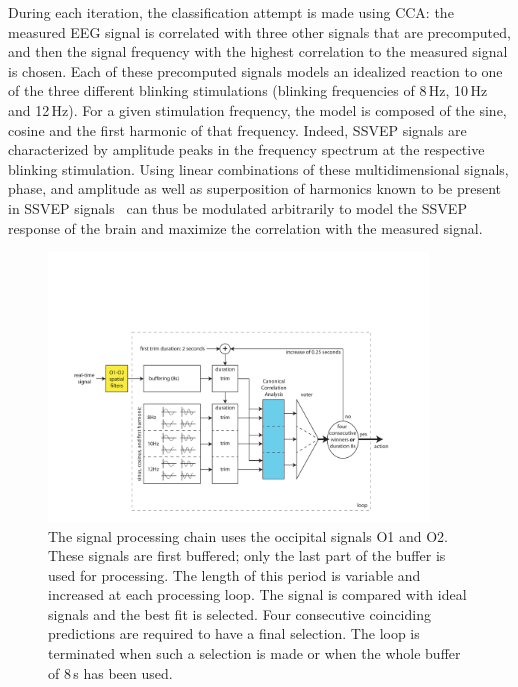 \documentclass[smallextended]{svjour3}
\begin{document}
During each iteration, the classification attempt is made using CCA: the measured EEG signal is correlated with three other signals that are precomputed, and then the signal frequency with the highest correlation to the measured signal is chosen.
Each of these precomputed signals models an idealized reaction to one of the three different blinking stimulations (blinking frequencies of 8\,Hz, 10\,Hz and 12\,Hz).
For a given stimulation frequency, the model is composed of the sine, cosine and the first harmonic of that frequency.
Indeed, SSVEP signals are characterized by amplitude peaks in the frequency spectrum at the respective blinking stimulation.
Using linear combinations of these multidimensional signals, phase, and amplitude as well as superposition of harmonics known to be present in SSVEP signals~\cite{herrmann2001} can thus be modulated arbitrarily to model the SSVEP response of the brain and maximize the correlation with the measured signal.

\begin{figure}
\center
\includegraphics[width=0.9\textwidth]{figures/schema-openvibe-cca.pdf}
\caption{The signal processing chain uses the occipital signals O1 and O2. These signals are first buffered; only the last part of the buffer is used for processing. The length of this period is variable and increased at each processing loop. The signal is compared with ideal signals and the best fit is selected. Four consecutive coinciding predictions are required to have a final selection. The loop is terminated when such a selection is made or when the whole buffer of 8\,s has been used.}
\label{fig:schema-openvibe-cca}
\end{figure}
\end{document}

